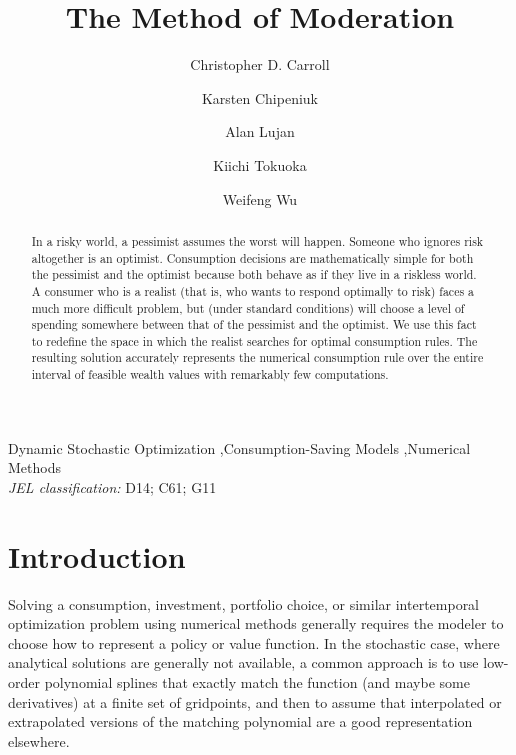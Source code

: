 \documentclass[preprint,authoryear]{elsarticle}
\begin{document}
\begin{frontmatter}

\title{The Method of Moderation}

\author[1,2]{Christopher D. Carroll}\author[3]{Karsten Chipeniuk}\author[1,2]{Alan Lujan}\author[4]{Kiichi Tokuoka}\author[5]{Weifeng Wu}


\begin{abstract}
In a risky world, a pessimist assumes the worst will happen. Someone who ignores risk altogether is an optimist. Consumption decisions are mathematically simple for both the pessimist and the optimist because both behave as if they live in a riskless world. A consumer who is a realist (that is, who wants to respond optimally to risk) faces a much more difficult problem, but (under standard conditions) will choose a level of spending somewhere between that of the pessimist and the optimist. We use this fact to redefine the space in which the realist searches for optimal consumption rules. The resulting solution accurately represents the numerical consumption rule over the entire interval of feasible wealth values with remarkably few computations.
\end{abstract}

\begin{keyword}
Dynamic Stochastic Optimization \sep Consumption-Saving Models \sep Numerical Methods \\ \textit{JEL classification:} D14; C61; G11\end{keyword}

\end{frontmatter}

\section{Introduction}

Solving a consumption, investment, portfolio choice, or similar intertemporal
optimization problem using numerical methods generally requires the modeler to
choose how to represent a policy or value function. In the stochastic case,
where analytical solutions are generally not available, a common approach is to
use low-order polynomial splines that exactly match the function (and maybe some
derivatives) at a finite set of gridpoints, and then to assume that interpolated
or extrapolated versions of the matching polynomial are a good representation elsewhere.
\end{document}
